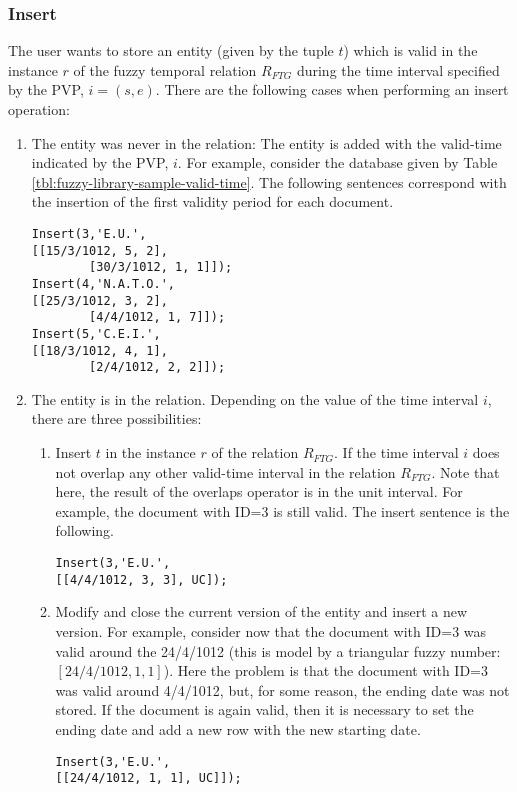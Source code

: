 \subsubsection{\label{subsubsec:insert-fuzzy-temporal}Insert}
The user wants to store an entity (given by the tuple $t$) which is valid in the instance $r$ of the fuzzy temporal relation $R_{FTG}$ during the time interval specified by the PVP, $i = \left(s, e \right)$.
%
%
There are the following cases when performing an insert operation:
\begin{enumerate}
\item The entity was never in the relation: The entity is added with the valid-time indicated by the PVP, $i$.
For example, consider the database given by Table \ref{tbl:fuzzy-library-sample-valid-time}. The following sentences correspond with the insertion of the first validity period for each document.

\begin{verbatim}
Insert(3,'E.U.',
[[15/3/1012, 5, 2],
        [30/3/1012, 1, 1]]);
Insert(4,'N.A.T.O.',
[[25/3/1012, 3, 2], 
        [4/4/1012, 1, 7]]);
Insert(5,'C.E.I.',
[[18/3/1012, 4, 1], 
        [2/4/1012, 2, 2]]);
\end{verbatim}





\item The entity is in the relation. Depending on the value of the time interval $i$, there are three possibilities:
	\begin{enumerate}
	\item Insert $t$ in the instance $r$ of the relation $R_{FTG}$. If the time interval $i$ does not overlap any other valid-time interval in the relation $R_{FTG}$. Note that here, the result of the overlaps operator is in the unit interval.
For example, the document with ID=3 is still valid. The insert sentence is the following.

 \begin{verbatim}
Insert(3,'E.U.',
[[4/4/1012, 3, 3], UC]);
	      \end{verbatim}

	\item Modify and close the current version of the entity and insert a new version. For example, consider now that the document with ID=3 was valid  around the 24/4/1012 (this is model by a triangular fuzzy number: $\left[24/4/1012, 1, 1 \right]$). Here the problem is that the document with ID=3 was valid around 4/4/1012, but, for some reason, the ending date was not stored. If the document is again valid, then it is necessary to set the ending date and add a new row with the new starting date. %
	    \begin{verbatim}
Insert(3,'E.U.',
[[24/4/1012, 1, 1], UC]]);
	      \end{verbatim}


\end{enumerate}
\end{enumerate}
